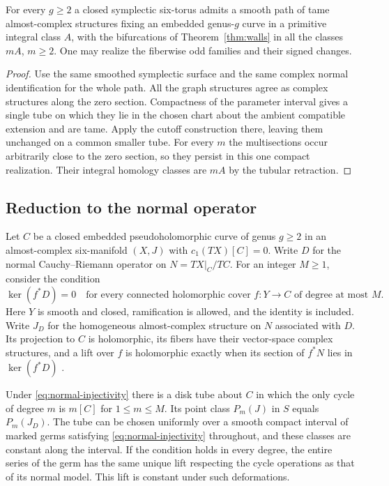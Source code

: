 \begin{corollary}\label{cor:torus}
For every $g\ge2$ a closed symplectic six-torus admits a smooth path
of tame almost-complex structures fixing an embedded genus-$g$ curve
in a primitive integral class $A$, with the bifurcations of
Theorem~\ref{thm:walls} in all the classes $mA$, $m\ge2$.
One may realize the fiberwise odd families and their signed changes.
\end{corollary}
\begin{proof}
Use the same smoothed symplectic surface and the same complex normal
identification for the whole path. All the graph structures agree as
complex structures along the zero section. Compactness of the parameter
interval gives a single tube on which they lie in the chosen chart
about the ambient compatible extension and are tame. Apply the cutoff
construction there, leaving them unchanged on a common smaller tube.
For every $m$ the multisections occur arbitrarily close to the zero
section, so they persist in this one compact realization. Their
integral homology classes are $mA$ by the tubular retraction.
\end{proof}

\subsection{Reduction to the normal operator}\label{sec:rescale}

Let $C$ be a closed embedded pseudoholomorphic curve of genus $g\ge2$
in an almost-complex six-manifold $(X,J)$ with $c_1(TX)[C]=0$.
Write $D$ for the normal Cauchy--Riemann operator on
$N=TX|_C/TC$. For an integer $M\ge1$, consider the condition
\begin{equation}\label{eq:normal-injectivity}
  \ker(f^*D)=0
  \quad\text{for every connected holomorphic cover }f:Y\to C
  \text{ of degree at most }M .
\end{equation}
Here $Y$ is smooth and closed, ramification is allowed, and the
identity is included. Write $J_D$ for the homogeneous almost-complex
structure on $N$ associated with $D$. Its projection to $C$ is
holomorphic, its fibers have their vector-space complex structures,
and a lift over $f$ is holomorphic exactly when its section of
$f^*N$ lies in $\ker(f^*D)$ \cite[Lemma~3.6]{dwcast}.

\begin{proposition}\label{prop:rescale}
Under \eqref{eq:normal-injectivity} there is a disk tube about $C$
in which the only cycle of degree $m$ is $m[C]$ for $1\le m\le M$.
Its point class $P_m(J)$ in $S$ equals $P_m(J_D)$.
The tube can be chosen uniformly over a smooth compact interval of
marked germs satisfying \eqref{eq:normal-injectivity} throughout,
and these classes are constant along the interval. If the condition
holds in every degree, the entire series of the germ has the same
unique lift respecting the cycle operations as that of its normal
model. This lift is constant under such deformations.
\end{proposition}

